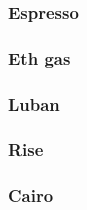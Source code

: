 \documentclass[a4paper]{article}
\theoremstyle{boldstyle}
\begin{document}
        \subsubsection{ \textbf{Espresso}}
        
        \subsubsection{ \textbf{Eth gas}}
        
        \subsubsection{ \textbf{Luban}}
        
        \subsubsection{ \textbf{Rise}}
        
        \subsubsection{ \textbf{Cairo}}
        
        
\end{document}
